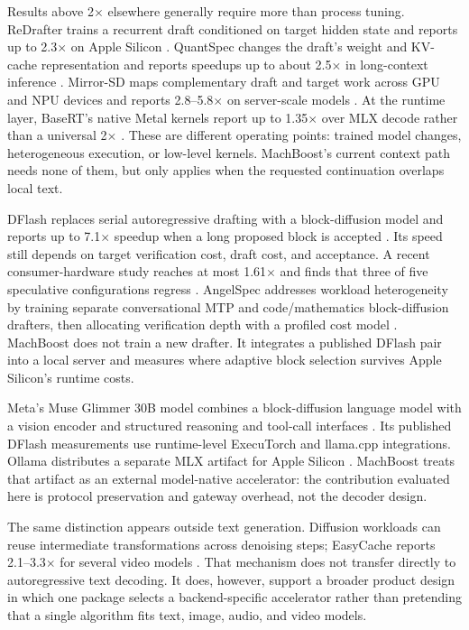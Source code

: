\documentclass[11pt]{article}
\begin{document}
Results above 2$\times$ elsewhere generally require more than process tuning. ReDrafter trains a recurrent draft conditioned on target hidden state and reports up to 2.3$\times$ on Apple Silicon \cite{zhang2024redrafter}. QuantSpec changes the draft's weight and KV-cache representation and reports speedups up to about 2.5$\times$ in long-context inference \cite{tiwari2025quantspec}. Mirror-SD maps complementary draft and target work across GPU and NPU devices and reports 2.8--5.8$\times$ on server-scale models \cite{bhendawade2025mirror}. At the runtime layer, BaseRT's native Metal kernels report up to 1.35$\times$ over MLX decode rather than a universal 2$\times$ \cite{rathnayaka2026basert}. These are different operating points: trained model changes, heterogeneous execution, or low-level kernels. MachBoost's current context path needs none of them, but only applies when the requested continuation overlaps local text.

DFlash replaces serial autoregressive drafting with a block-diffusion model and
reports up to 7.1$\times$ speedup when a long proposed block is accepted
\cite{chen2026dflash}. Its speed still depends on target verification cost,
draft cost, and acceptance. A recent consumer-hardware study reaches at most
1.61$\times$ and finds that three of five speculative configurations regress
\cite{chordiya2026lossless}. AngelSpec addresses workload heterogeneity by
training separate conversational MTP and code/mathematics block-diffusion
drafters, then allocating verification depth with a profiled cost model
\cite{liu2026angelspec}. MachBoost does not train a new drafter. It integrates a
published DFlash pair into a local server and measures where adaptive block
selection survives Apple Silicon's runtime costs.

Meta's Muse Glimmer 30B model combines a block-diffusion language model with a
vision encoder and structured reasoning and tool-call interfaces
\cite{meta2026museglimmer}. Its published DFlash measurements use runtime-level
ExecuTorch and llama.cpp integrations. Ollama distributes a separate MLX
artifact for Apple Silicon \cite{ollama2026museglimmer}. MachBoost treats that
artifact as an external model-native accelerator: the contribution evaluated
here is protocol preservation and gateway overhead, not the decoder design.

The same distinction appears outside text generation. Diffusion workloads can reuse intermediate transformations across denoising steps; EasyCache reports 2.1--3.3$\times$ for several video models \cite{zhou2025easycache}. That mechanism does not transfer directly to autoregressive text decoding. It does, however, support a broader product design in which one package selects a backend-specific accelerator rather than pretending that a single algorithm fits text, image, audio, and video models.
\end{document}
